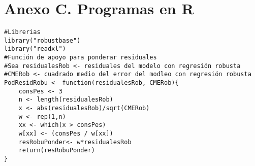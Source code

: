 \section*{Anexo C. Programas en R}

\begin{verbatim}
#Librerias
library("robustbase")
library("readxl")
#Función de apoyo para ponderar residuales
#Sea residualesRob <- residuales del modelo con regresión robusta
#CMERob <- cuadrado medio del error del modleo con regresión robusta
PodResidRobu <- function(residualesRob, CMERob){
	consPes <- 3
	n <- length(residualesRob)
	x <- abs(residualesRob)/sqrt(CMERob)
	w <- rep(1,n)
	xx <- which(x > consPes) 
	w[xx] <- (consPes / w[xx])
	resRobuPonder<- w*residualesRob
	return(resRobuPonder)
}
\end{verbatim}


